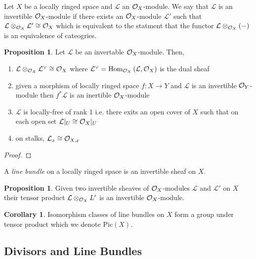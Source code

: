 \documentclass[12pt]{extarticle}
\theoremstyle{definition}
\newtheorem{proposition}[theorem]{Proposition}
\newtheorem{corollary}[theorem]{Corollary}
\newenvironment{definition}[1][Definition:]{\begin{trivlist}
\item[\hskip \labelsep {\bfseries #1}]}{\end{trivlist}}
\begin{document}
\renewcommand{\L}{\mathcal{L}}
\newcommand{\Pic}[1]{\mathrm{Pic}\left( #1 \right)}

\begin{definition}
Let $X$ be a locally ringed space and $\L$ an $\mathcal{O}_{X}$-module. We say that $\L$ is an invertible $\mathcal{O}_{X}$-module if there exists an $\mathcal{O}_{X}$-module $\L'$ such that $\L \otimes_{\struct{X}} \L' \cong \struct{X}$ which is equivalent to the statment that the functor $\L \otimes_{\struct{X}} (-)$ is an equivalence of cateogries. 
\end{definition}

\begin{proposition}
Let $\L$ be an invertable $\mathcal{O}_{X}$-module. Then,
\begin{enumerate}
\item $\L \otimes_{\struct{X}} \L^\vee \cong \struct{X}$ where $\L^\vee = \Homover{\struct{X}}{\L}{\struct{X}}$ is the dual sheaf
\item given a morphism of locally ringed space $f : X \to Y$ and $\L$ is an invertible $\mathcal{O}_{Y}$-module then $f^* \L$ is an inertible $\mathcal{O}_{X}$-module
\item $\L$ is locally-free of rank 1 i.e. there exits an open cover of $X$ such that on each open set $\L |_U \cong \struct{X} |_U$
\item on stalks, $\L_x \cong \stalk{X}{x}$
\end{enumerate}
\end{proposition}

\begin{proof}

\end{proof}

\begin{definition}
A \textit{line bundle} on a locally ringed space is an invertible sheaf on $X$.
\end{definition}

\begin{proposition}
Given two invertible sheaves of $\mathcal{O}_{X}$-modules $\L$ and $\L'$ on $X$ their tensor product $\L \otimes_{\struct{X}} L'$ is an invertible $\mathcal{O}_{X}$-module. 
\end{proposition}

\begin{corollary}
Isomorphism classes of line bundles on $X$ form a group under tensor product which we denote $\Pic{X}$. 
\end{corollary}


\subsection{Divisors and Line Bundles}
\end{document}
